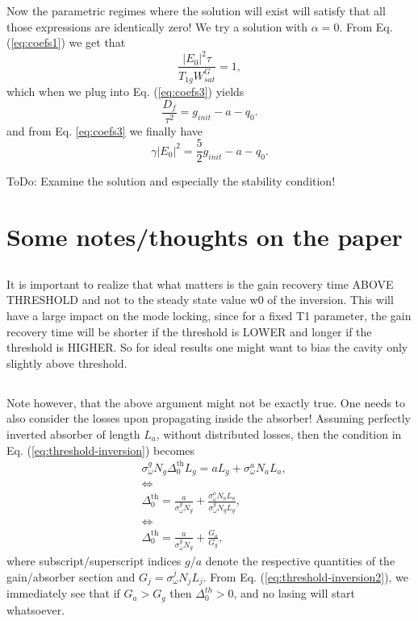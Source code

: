 \documentclass[preprint,secnumarabic,amssymb, nobibnotes, aip, prd]{revtex4-1}
\begin{document}
Now the parametric regimes where the solution will exist will satisfy that all those expressions are identically zero! We try a solution with $\alpha = 0$. From Eq. (\ref{eq:coefs1}) we get that
\begin{equation}
\frac{|E_0|^2\tau}{T_{1g}W_{sat}^G}=1,
\end{equation}
which when we plug into Eq. (\ref{eq:coefs3}) yields
\begin{equation}
\frac{D_f}{\tau^2} = g_{init} - a-q_0. 
\end{equation}
and from Eq. \ref{eq:coefs3} we finally have
\begin{equation}
\gamma|E_0|^2 = \frac{5}{2}g_{init}-a-q_0.
\end{equation}

ToDo: Examine the solution and especially the stability condition! 



\section{Some notes/thoughts on the paper}
\subsection{}
	It is important to realize that what matters is the gain recovery time ABOVE THRESHOLD and not to the steady state value w0 of the inversion. This will have a large impact on the mode locking, since for a fixed T1 parameter, the gain recovery time will be shorter if the threshold is LOWER and longer if the threshold is HIGHER. So for ideal results one might want to bias the cavity only slightly above threshold.
\subsection{}
	Note however, that the above argument might not be exactly true. One needs to also consider the losses upon propagating inside the absorber! Assuming perfectly inverted absorber of length $L_a$, without distributed losses, then the condition in Eq. (\ref{eq:threshold-inversion}) becomes
	\begin{align}
	\label{eq:threshold-inversion2}
	&\sigma_{\omega}^{g}N_g\Delta_0^{\text{th}}L_g = aL_g+ \sigma_{\omega}^a N_a L_a, \nonumber \\
	& \Leftrightarrow \nonumber \\
	&\Delta_0^{\text{th}} = \frac{a}{\sigma_{\omega}^{g}N_g} + \frac{\sigma_{\omega}^{a}N_a L_a}{\sigma_{\omega}^{g}N_g L_g}, \nonumber \\
	& \Leftrightarrow \nonumber \\
	&\Delta_0^{\text{th}} = \frac{a}{\sigma_{\omega}^{g}N_g} +  \frac{G_a}{G_g},
	\end{align}
	where subscript/superscript indices $g$/$a$ denote the respective quantities of the gain/absorber section and $G_j = \sigma_{\omega}^{j}N_j L_j$. From Eq. (\ref{eq:threshold-inversion2}), we immediately see that 
	if $G_a>G_g$ then $\Delta_0^{th} > 0$, and no lasing will start whatsoever. 
\end{document}
